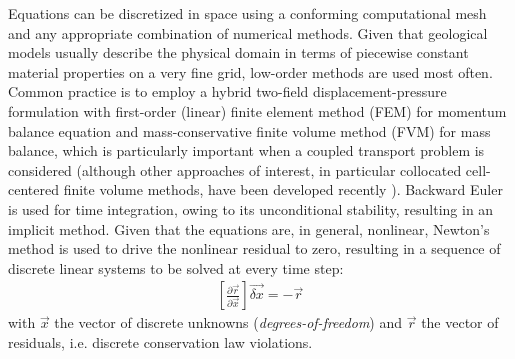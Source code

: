 Equations  can be discretized in space using a conforming computational mesh and any appropriate combination of numerical methods.   Given that geological models usually describe the physical domain in terms of piecewise constant material properties on a very fine grid, low-order methods are used most often.   Common practice is to employ a hybrid two-field displacement-pressure formulation with first-order (linear) finite element method (FEM) for momentum balance equation and mass-conservative finite volume method (FVM) for mass balance, which is particularly important when a coupled transport problem is considered (although other approaches of interest, in particular collocated cell-centered finite volume methods, have been developed recently \cite{Nordbotten2016,Terekhov2020}).   Backward Euler is used for time integration, owing to its unconditional stability, resulting in an implicit method.   Given that the equations are, in general, nonlinear, Newton's method is used to drive the nonlinear residual to zero, resulting in a sequence of discrete linear systems to be solved at every time step:
\begin{align}
    \left[\frac{\partial \vec{r}}{\partial \vec{x}}\right] \vec{\delta x} = -\vec{r}
\end{align}
with $\vec{x}$ the vector of discrete unknowns (\textit{degrees-of-freedom}) and $\vec{r}$ the vector of residuals, i.e. discrete conservation law violations.

